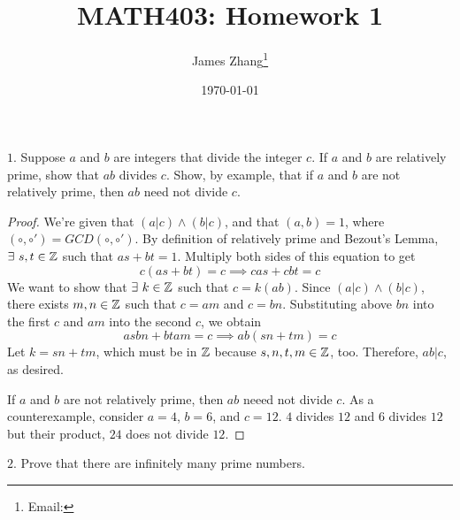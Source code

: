 \documentclass[12pt]{scrartcl}
\begin{document}
\title{MATH403: Homework 1}
\author{James Zhang\thanks{Email: }}
\date{\today}



\maketitle

$1.$ Suppose $a$ and $b$ are integers that divide the integer $c$. If $a$ and 
$b$ are relatively prime, show that $ab$ divides $c$. Show, by example, that if $a$ and 
$b$ are not relatively prime, then $ab$ need not divide $c$.

\begin{proof}
  We're given that $(a | c) \land (b | c)$, and that $(a, b) = 1$, where $(\circ, \circ') = GCD(\circ, \circ')$. 
  By definition of relatively prime and Bezout's Lemma, $\exists \ s, t \in \mathbb Z$ such that $as + bt = 1$. Multiply both sides 
  of this equation to get 
  \[c(as + bt) = c \implies cas + cbt = c\]
  We want to show that $\exists \ k \in \mathbb Z$ such that $c = k(ab)$. Since $(a | c) \land (b | c)$, 
  there exists $m, n \in \mathbb Z$ such that $c = am$ and $c = bn$. Substituting above $bn$ into the first $c$ 
  and $am$ into the second $c$, we obtain 
  \[asbn + btam = c \implies ab(sn + tm) = c\]
  Let $k = sn + tm$, which must be in $\mathbb Z$ because $s, n, t, m \in \mathbb Z$, too. Therefore, 
  $ab | c$, as desired.

  \hfill

  If $a$ and $b$ are not relatively prime, then $ab$ neeed not divide $c$. As a counterexample, consider 
  $a = 4$, $b=6$, and $c=12$. $4$ divides $12$ and $6$ divides $12$ but their product, $24$ does not 
  divide $12$.
\end{proof}

\newpage

$2.$ Prove that there are infinitely many prime numbers.
\end{document}
